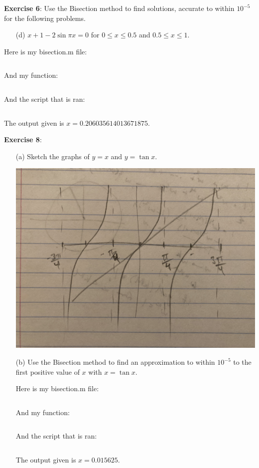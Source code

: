 \documentclass{article}
\begin{document}
\textbf{Exercise 6}:
    Use the Bisection method to find solutions, accurate to within $10^{-5}$ for the following problems.
    \begin{itemize}
        \item [(d)] $x + 1 - 2\sin{\pi x} = 0$ for $0 \leq x \leq 0.5$ and $0.5 \leq x \leq 1$.
    \end{itemize}
    \begin{answer}
        Here is my bisection.m file:
        \inputminted{matlab}{bisection.m}
        And my function:
        \inputminted{matlab}{myfunc.m}
        And the script that is ran:
        \inputminted{matlab}{script.m}
        The output given is $x = 0.206035614013671875$.
    \end{answer}

\textbf{Exercise 8}:
    \begin{itemize}
        \item [(a)] Sketch the graphs of $y = x$ and $y = \tan{x}$.
            \begin{center}
                \includegraphics[scale=0.05]{x_and_tanx.jpg}
            \end{center}

        \item [(b)] Use the Bisection method to find an approximation to within $10^{-5}$ to the first positive value of $x$ with $x = \tan{x}$. 
        \begin{answer}
            Here is my bisection.m file:
            \inputminted{matlab}{bisection.m}
            And my function:
            \inputminted{matlab}{myfunc2.m}
            And the script that is ran:
            \inputminted{matlab}{script.m}
            The output given is $x = 0.015625$.
        \end{answer}
    \end{itemize}
\end{document}
